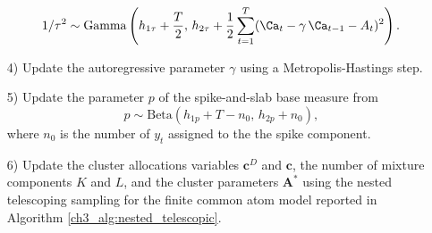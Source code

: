 \begin{enumerate}
\begin{equation*}
	1/\tau^2 \sim \mathrm{Gamma}\left( h_{1\tau} + \frac{T}{2},\, h_{2\tau} + \frac{1}{2} \sum_{t=1}^T (\Ca_t - \gamma \, \Ca_{t-1} - A_t)^2 \right).
	\end{equation*}
	\item[4)] Update the autoregressive parameter $\gamma$ using a Metropolis-Hastings step.
	\item[5)] Update the parameter $p$ of the spike-and-slab base measure from
	\begin{equation*}
	p \sim \mathrm{Beta}(h_{1p} + T - n_0,\, h_{2p} + n_0), 
	\end{equation*}
	where $n_0$ is the number of $y_t$ assigned to the the spike component.
	\item[6)] Update the cluster allocations variables $\bm{c}^D$ and $\bm{c}$, the number of mixture components $K$ and $L$, and the cluster parameters $\bm{A^*}$ using the nested telescoping sampling for the finite common atom model reported in Algorithm \ref{ch3_alg:nested_telescopic}.
\end{enumerate}

